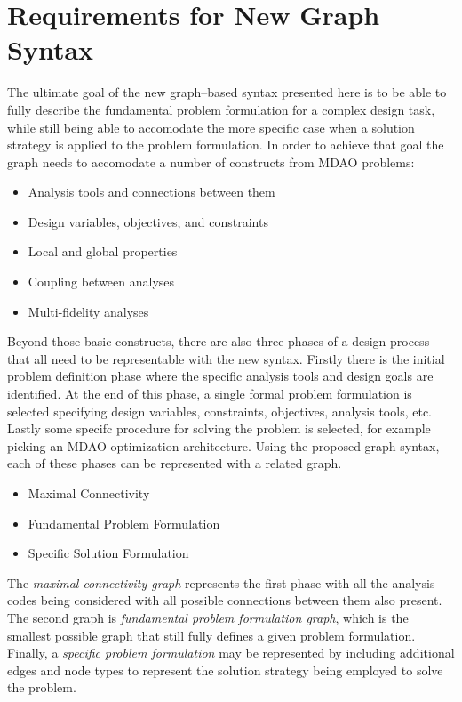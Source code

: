 \newcommand{\st}{ \ | \ }

\section{Requirements for New Graph Syntax}
The ultimate goal of the new graph--based syntax presented here is to be able to 
fully describe the fundamental problem formulation for a complex design task, 
while still being able to accomodate the more specific case when a solution 
strategy is applied to the problem formulation. In order to achieve that goal 
the graph needs to accomodate a number of constructs from MDAO problems: 

\begin{itemize}
    \item Analysis tools and connections between them
    \item Design variables, objectives, and constraints
    \item Local and global properties
    \item Coupling between analyses
    \item Multi-fidelity analyses
\end{itemize}

Beyond those basic constructs, there are also three phases of a design process that 
all need to be representable with the new syntax. Firstly there is the initial problem definition
phase where the specific analysis tools and design goals are identified. At the end of this phase, 
a single formal problem formulation is selected specifying design variables, constraints, objectives, 
analysis tools, etc. Lastly some specifc procedure for solving the problem is selected, for example 
picking an MDAO optimization architecture. Using the proposed graph syntax, each of these phases 
can be represented with a related graph. 

\begin{itemize}
    \item Maximal Connectivity
    \item Fundamental Problem Formulation 
    \item Specific Solution Formulation
\end{itemize}

The \emph{maximal connectivity graph} represents the first phase with all the 
analysis codes being considered with all possible connections between them also present. The second graph 
is \emph{fundamental problem formulation graph}, which is the smallest possible graph 
that still fully defines a given problem formulation. Finally, a \emph{specific problem formulation} 
may be represented by including additional edges and node types to represent the 
solution strategy being employed to solve the problem. 

